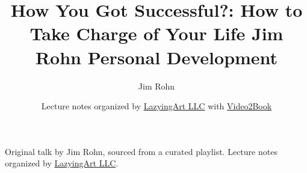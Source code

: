 \documentclass[11pt,oneside]{book}
\begin{document}
\frontmatter
\title{How You Got Successful?: How to Take Charge of Your Life Jim Rohn Personal Development}
\author{Jim Rohn}
\date{Lecture notes organized by \href{https://lazying.art}{LazyingArt LLC} with \href{https://github.com/lachlanchen/Video2Book}{Video2Book}}
\maketitle
\begin{center}
\small Original talk by Jim Rohn, sourced from a curated playlist. Lecture notes organized by \href{https://lazying.art}{LazyingArt LLC}.
\end{center}
\clearpage
\mainmatter

\end{document}
